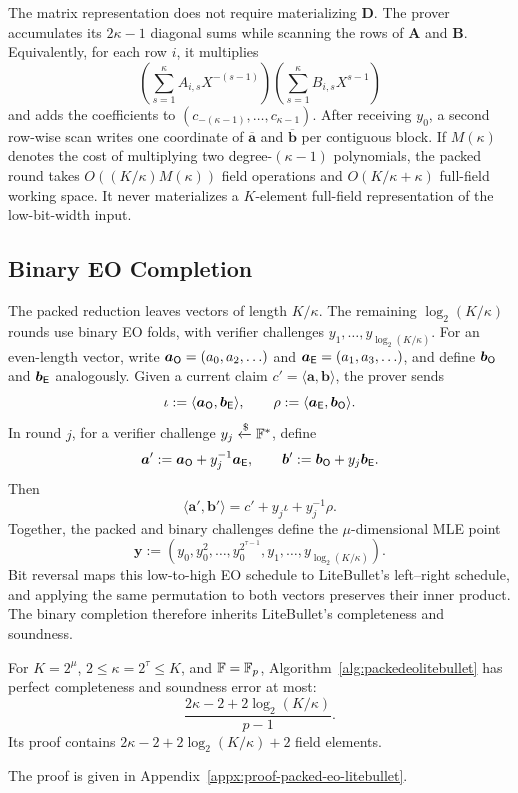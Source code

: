 The matrix representation does not require materializing $\bm D$. The prover
accumulates its $2\kappa-1$ diagonal sums while scanning the rows of $\bm A$
and $\bm B$. Equivalently, for each row $i$, it multiplies
\[
    \left(\sum_{s=1}^{\kappa}A_{i,s}X^{-(s-1)}\right)
    \left(\sum_{s=1}^{\kappa}B_{i,s}X^{s-1}\right)
\]
and adds the coefficients to $(c_{-(\kappa-1)},\ldots,c_{\kappa-1})$.
After receiving $y_0$, a second row-wise scan writes one coordinate of
$\overline{\bm a}$ and $\overline{\bm b}$ per contiguous block. If
$M(\kappa)$ denotes the cost of multiplying two degree-$(\kappa-1)$
polynomials, the packed round takes $O((K/\kappa)M(\kappa))$ field operations
and $O(K/\kappa+\kappa)$ full-field working space. It never materializes a
$K$-element full-field representation of the low-bit-width input.

\subsection{Binary EO Completion}

The packed reduction leaves vectors of length $K/\kappa$. The remaining
$\log_2(K/\kappa)$ rounds use binary EO folds, with verifier challenges
$y_1,\ldots,y_{\log_2(K/\kappa)}$. For an even-length vector, write
$\bm a_{\sf O}=(a_0,a_2,\ldots)$ and
$\bm a_{\sf E}=(a_1,a_3,\ldots)$, and define
$\bm b_{\sf O}$ and $\bm b_{\sf E}$ analogously. Given a current claim
$c'=\langle\bm a,\bm b\rangle$, the prover sends
\[
    \iota:=\langle\bm a_{\sf O},\bm b_{\sf E}\rangle,
    \qquad
    \rho:=\langle\bm a_{\sf E},\bm b_{\sf O}\rangle.
\]
In round $j$, for a verifier challenge
$y_j\mathrel{\xleftarrow{\$}}{\mathbb{F}}^*$, define
\[
    \bm a':=\bm a_{\sf O}+y_j^{-1}\bm a_{\sf E},
    \qquad
    \bm b':=\bm b_{\sf O}+y_j\bm b_{\sf E}.
\]
Then
\begin{equation}
\label{eq:binary-eo-fold}
    \langle\bm a',\bm b'\rangle
    =c'+y_j\iota+y_j^{-1}\rho.
\end{equation}
Together, the packed and binary challenges define the $\mu$-dimensional MLE
point
\[
    \bm y
    :=(y_0,y_0^2,\ldots,y_0^{2^{\tau-1}},
       y_1,\ldots,y_{\log_2(K/\kappa)}).
\]
Bit reversal maps this low-to-high EO schedule to LiteBullet's left--right
schedule, and applying the same permutation to both vectors preserves their
inner product. The binary completion therefore inherits LiteBullet's
completeness and soundness.



\begin{theorem}
\label{thm:packedeolitebullet}
For $K=2^\mu$, $2\le\kappa=2^\tau\le K$, and
${\mathbb{F}}=\mathbb F_p$, Algorithm~\ref{alg:packedeolitebullet} has perfect
completeness and soundness error at most:
\[
    \frac{2\kappa-2+2\log_2(K/\kappa)}{p-1}.
\]
Its proof contains
$2\kappa-2+2\log_2(K/\kappa)+2$ field elements.
\end{theorem}
The proof is given in Appendix~\ref{appx:proof-packed-eo-litebullet}.


